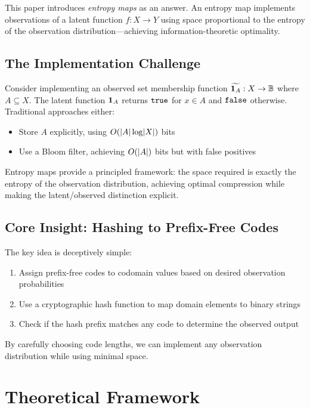 \documentclass[11pt,final,hidelinks]{article}
\begin{document}
This paper introduces \emph{entropy maps} as an answer. An entropy map implements observations of a latent function $f: X \to Y$ using space proportional to the entropy of the observation distribution—achieving information-theoretic optimality.

\subsection{The Implementation Challenge}

Consider implementing an observed set membership function $\widetilde{\mathbf{1}_{A}}: X \to \mathbb{B}$ where $A \subseteq X$. The latent function $\mathbf{1}_{A}$ returns $\mathtt{true}$ for $x \in A$ and $\mathtt{false}$ otherwise. Traditional approaches either:
\begin{itemize}
    \item Store $A$ explicitly, using $O(\lvert A\rvert \log \lvert X\rvert)$ bits
    \item Use a Bloom filter, achieving $O(\lvert A\rvert)$ bits but with false positives
\end{itemize}

Entropy maps provide a principled framework: the space required is exactly the entropy of the observation distribution, achieving optimal compression while making the latent/observed distinction explicit.

\subsection{Core Insight: Hashing to Prefix-Free Codes}

The key idea is deceptively simple:
\begin{enumerate}
    \item Assign prefix-free codes to codomain values based on desired observation probabilities
    \item Use a cryptographic hash function to map domain elements to binary strings
    \item Check if the hash prefix matches any code to determine the observed output
\end{enumerate}

By carefully choosing code lengths, we can implement any observation distribution while using minimal space.

\section{Theoretical Framework}
\end{document}

